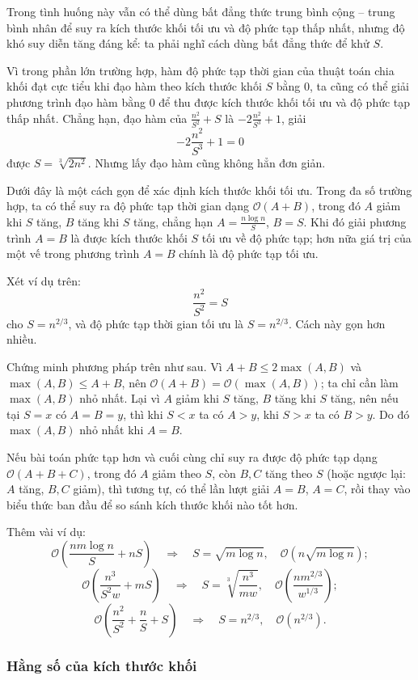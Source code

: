 \documentclass[11pt]{article}
\newcommand{\Oh}{\mathcal{O}}
\begin{document}
Trong tình huống này vẫn có thể dùng bất đẳng thức trung bình cộng -- trung
bình nhân để suy ra kích thước khối tối ưu và độ phức tạp thấp nhất, nhưng độ
khó suy diễn tăng đáng kể: ta phải nghĩ cách dùng bất đẳng thức để khử \(S\).

Vì trong phần lớn trường hợp, hàm độ phức tạp thời gian của thuật toán chia
khối đạt cực tiểu khi đạo hàm theo kích thước khối \(S\) bằng \(0\), ta cũng
có thể giải phương trình đạo hàm bằng \(0\) để thu được kích thước khối tối ưu
và độ phức tạp thấp nhất. Chẳng hạn, đạo hàm của \(\frac{n^2}{S^2}+S\) là
\(-2\frac{n^2}{S^3}+1\), giải
\[
  -2\frac{n^2}{S^3}+1=0
\]
được \(S=\sqrt[3]{2n^2}\). Nhưng lấy đạo hàm cũng không hẳn đơn giản.

Dưới đây là một cách gọn để xác định kích thước khối tối ưu. Trong đa số
trường hợp, ta có thể suy ra độ phức tạp thời gian dạng \(\Oh(A+B)\), trong
đó \(A\) giảm khi \(S\) tăng, \(B\) tăng khi \(S\) tăng, chẳng hạn
\(A=\frac{n\log n}{S}\), \(B=S\). Khi đó giải phương trình \(A=B\) là được
kích thước khối \(S\) tối ưu về độ phức tạp; hơn nữa giá trị của một vế trong
phương trình \(A=B\) chính là độ phức tạp tối ưu.

Xét ví dụ trên:
\[
  \frac{n^2}{S^2}=S
\]
cho \(S=n^{2/3}\), và độ phức tạp thời gian tối ưu là \(S=n^{2/3}\). Cách này
gọn hơn nhiều.

Chứng minh phương pháp trên như sau. Vì \(A+B\le 2\max(A,B)\) và
\(\max(A,B)\le A+B\), nên \(\Oh(A+B)=\Oh(\max(A,B))\); ta chỉ cần làm
\(\max(A,B)\) nhỏ nhất. Lại vì \(A\) giảm khi \(S\) tăng, \(B\) tăng khi
\(S\) tăng, nên nếu tại \(S=x\) có \(A=B=y\), thì khi \(S<x\) ta có \(A>y\),
khi \(S>x\) ta có \(B>y\). Do đó \(\max(A,B)\) nhỏ nhất khi \(A=B\).

Nếu bài toán phức tạp hơn và cuối cùng chỉ suy ra được độ phức tạp dạng
\(\Oh(A+B+C)\), trong đó \(A\) giảm theo \(S\), còn \(B,C\) tăng theo \(S\)
(hoặc ngược lại: \(A\) tăng, \(B,C\) giảm), thì tương tự, có thể lần lượt giải
\(A=B\), \(A=C\), rồi thay vào biểu thức ban đầu để so sánh kích thước khối
nào tốt hơn.

Thêm vài ví dụ:
\[
  \Oh\left(\frac{nm\log n}{S}+nS\right)
  \quad\Rightarrow\quad
  S=\sqrt{m\log n},\quad
  \Oh\left(n\sqrt{m\log n}\right);
\]
\[
  \Oh\left(\frac{n^3}{S^2w}+mS\right)
  \quad\Rightarrow\quad
  S=\sqrt[3]{\frac{n^3}{mw}},\quad
  \Oh\left(\frac{nm^{2/3}}{w^{1/3}}\right);
\]
\[
  \Oh\left(\frac{n^2}{S^2}+\frac nS+S\right)
  \quad\Rightarrow\quad
  S=n^{2/3},\quad
  \Oh(n^{2/3}).
\]

\subsubsection{Hằng số của kích thước khối}
\end{document}
